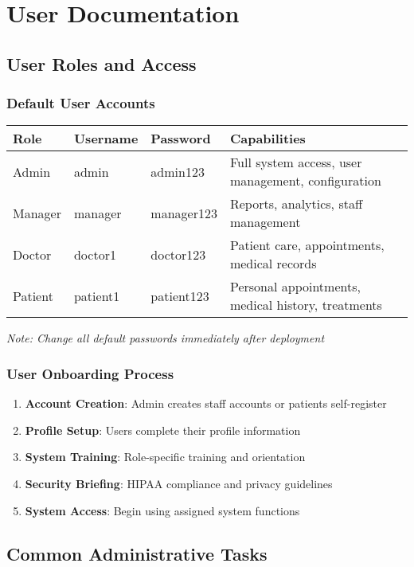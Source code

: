 \documentclass[12pt,a4paper]{article}
\begin{document}
\section{User Documentation}

\subsection{User Roles and Access}

\subsubsection{Default User Accounts}
\begin{longtable}{|p{2cm}|p{2cm}|p{2cm}|p{6cm}|}
\hline
\textbf{Role} & \textbf{Username} & \textbf{Password} & \textbf{Capabilities} \\
\hline
Admin & admin & admin123 & Full system access, user management, configuration \\
\hline
Manager & manager & manager123 & Reports, analytics, staff management \\
\hline
Doctor & doctor1 & doctor123 & Patient care, appointments, medical records \\
\hline
Patient & patient1 & patient123 & Personal appointments, medical history, treatments \\
\hline
\end{longtable}

\textit{Note: Change all default passwords immediately after deployment}

\subsubsection{User Onboarding Process}
\begin{enumerate}
    \item \textbf{Account Creation}: Admin creates staff accounts or patients self-register
    \item \textbf{Profile Setup}: Users complete their profile information
    \item \textbf{System Training}: Role-specific training and orientation
    \item \textbf{Security Briefing}: HIPAA compliance and privacy guidelines
    \item \textbf{System Access}: Begin using assigned system functions
\end{enumerate}

\subsection{Common Administrative Tasks}
\end{document}
